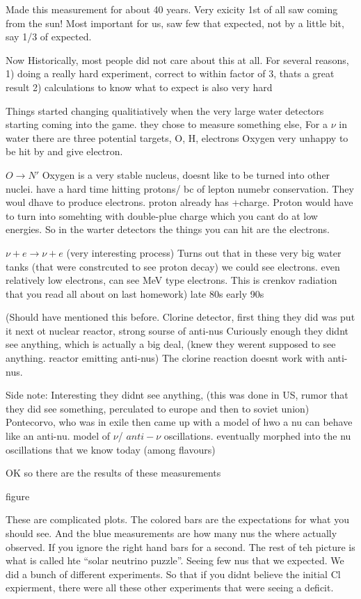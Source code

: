 {Made this measurement for about 40 years. 
Very exicity 
1st of all saw \nus coming from the sun!
Most important for us, saw few \nus that expected, not by a little bit,  say 1/3 of \nus expected. 

Now Historically, most people did not care about this at all.
For several reasons, 
1) doing a really hard experiment, correct to within factor of 3, thats a great result
2) calculations to know what to expect is also very hard 

Things started changing qualitiatively when the very large water detectors starting coming into the game. 
they chose to measure something else, 
For a $\nu$ in water there are three potential targets,  O, H, electrons
Oxygen very unhappy to be hit by \nus and give electron. 

$O \rightarrow N'$
 Oxygen is a very stable nucleus, doesnt like to be turned into other nuclei. 
\nus have a hard time hitting protons/ bc of lepton numebr conservation. 
They woul dhave to produce electrons. proton already has +charge.  Proton would have to turn into somehting with double-plue charge which you cant do at low energies. 
So in the warter detectors the things you can hit are the electrons. 

$\nu + e \rightarrow \nu + e$ (very interesting process) 
Turns out that in these very big water tanks (that were constrcuted to see proton decay) we could see electrons.
even relatively low electrons, can see MeV type electrons. This is crenkov radiation that you read all about on last homework) 
late 80s early 90s

(Should have mentioned this before. 
Clorine detector, first thing they did was put it next ot nuclear reactor, strong sourse of anti-nus 
Curiously enough they didnt see anything, which is actually a big deal, (knew they werent supposed to see anything. reactor emitting anti-nus) 
The clorine reaction doesnt work with anti-nus. 

Side note: 
Interesting they didnt see anything, (this was done in US, rumor that they did see something, perculated to europe and then to soviet union) 
Pontecorvo, who was in exile then came up with a model of hwo a nu can behave like an anti-nu.
model of $\nu$/ $anti-\nu$ oscillations. eventually morphed into the nu oscillations that we know today (among flavours) 


OK so there are the results of these measurements

figure 

These are complicated plots. 
The colored bars  are the expectations for what you should see.
And the blue measurements are how many nus the where actually observed.  
If you ignore the right hand bars for a second.
The rest of teh picture is what is called hte ``solar neutrino puzzle''. 
Seeing few nus that we expected. 
We did a bunch of different experiments.  
So that if you didnt believe the initial Cl expierment, there were all these other experiments that were seeing a deficit. 

}
